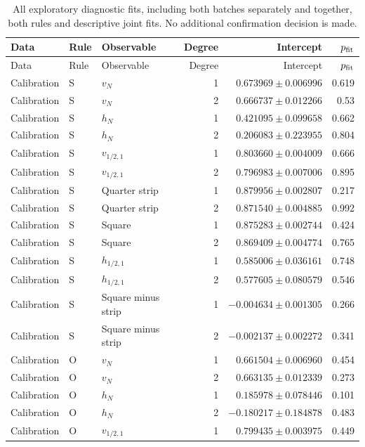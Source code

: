 {\small\setlength{\tabcolsep}{3.5pt}
\begin{longtable}{lllrrr}
\caption{All exploratory diagnostic fits, including both batches separately and together, both rules and descriptive joint fits. No additional confirmation decision is made.}\\
\toprule
Data & Rule & Observable & Degree & Intercept & $p_{\rm fit}$\\
\midrule
\endfirsthead
\toprule
Data & Rule & Observable & Degree & Intercept & $p_{\rm fit}$\\
\midrule
\endhead
\bottomrule\endfoot
Calibration & S & $v_N$ & 1 & $0.673969\pm0.006996$ & 0.619\\
Calibration & S & $v_N$ & 2 & $0.666737\pm0.012266$ & 0.53\\
Calibration & S & $h_N$ & 1 & $0.421095\pm0.099658$ & 0.662\\
Calibration & S & $h_N$ & 2 & $0.206083\pm0.223955$ & 0.804\\
Calibration & S & $v_{1/2,1}$ & 1 & $0.803660\pm0.004009$ & 0.666\\
Calibration & S & $v_{1/2,1}$ & 2 & $0.796983\pm0.007006$ & 0.895\\
Calibration & S & Quarter strip & 1 & $0.879956\pm0.002807$ & 0.217\\
Calibration & S & Quarter strip & 2 & $0.871540\pm0.004885$ & 0.992\\
Calibration & S & Square & 1 & $0.875283\pm0.002744$ & 0.424\\
Calibration & S & Square & 2 & $0.869409\pm0.004774$ & 0.765\\
Calibration & S & $h_{1/2,1}$ & 1 & $0.585006\pm0.036161$ & 0.748\\
Calibration & S & $h_{1/2,1}$ & 2 & $0.577605\pm0.080579$ & 0.546\\
Calibration & S & Square minus strip & 1 & $-0.004634\pm0.001305$ & 0.266\\
Calibration & S & Square minus strip & 2 & $-0.002137\pm0.002272$ & 0.341\\
Calibration & O & $v_N$ & 1 & $0.661504\pm0.006960$ & 0.454\\
Calibration & O & $v_N$ & 2 & $0.663135\pm0.012339$ & 0.273\\
Calibration & O & $h_N$ & 1 & $0.185978\pm0.078446$ & 0.101\\
Calibration & O & $h_N$ & 2 & $-0.180217\pm0.184878$ & 0.483\\
Calibration & O & $v_{1/2,1}$ & 1 & $0.799435\pm0.003975$ & 0.449\\

\end{longtable}}
